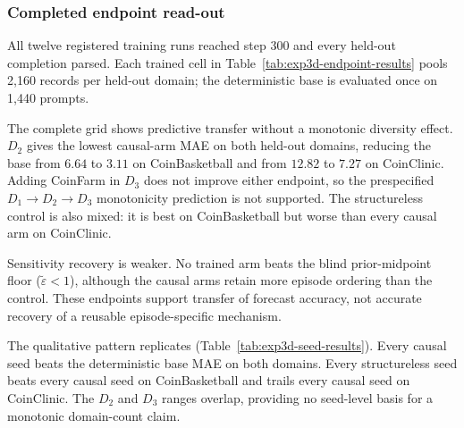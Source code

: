 \subsubsection{Completed endpoint read-out}
\label{app:exp3-domain-results}

All twelve registered training runs reached step 300 and every held-out
completion parsed. Each trained cell in Table~\ref{tab:exp3d-endpoint-results}
pools 2,160 records per held-out domain; the deterministic base is evaluated once
on 1,440 prompts.

The complete grid shows predictive transfer without a monotonic diversity effect.
$D_2$ gives the lowest causal-arm MAE on both held-out domains, reducing the base
from $6.64$ to $3.11$ on CoinBasketball and from $12.82$ to $7.27$ on CoinClinic.
Adding CoinFarm in $D_3$ does not improve either endpoint, so the prespecified
$D_1\!\to D_2\!\to D_3$ monotonicity prediction is not supported. The
structureless control is also mixed: it is best on CoinBasketball but worse than
every causal arm on CoinClinic.

Sensitivity recovery is weaker. No trained arm beats the blind prior-midpoint
floor ($\tilde\varepsilon<1$), although the causal arms retain more episode
ordering than the control. These endpoints support transfer of forecast accuracy,
not accurate recovery of a reusable episode-specific mechanism.

\begin{center}
\begin{minipage}{\linewidth}
\centering
{}
\label{tab:exp3d-endpoint-results}
\scriptsize
\setlength{\tabcolsep}{3pt}
\resizebox{\linewidth}{!}{}
\end{minipage}
\end{center}

The qualitative pattern replicates (Table~\ref{tab:exp3d-seed-results}). Every
causal seed beats the deterministic base MAE on both domains. Every structureless
seed beats every causal seed on CoinBasketball and trails every causal seed on
CoinClinic. The $D_2$ and $D_3$ ranges overlap, providing no seed-level basis for
a monotonic domain-count claim.

\begin{center}
\begin{minipage}{\linewidth}
\centering
{}
\label{tab:exp3d-seed-results}
\scriptsize
\setlength{\tabcolsep}{4pt}
\resizebox{\linewidth}{!}{%

}
\end{minipage}
\end{center}

